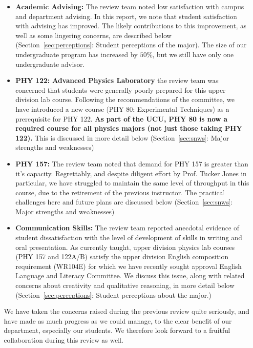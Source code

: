 \documentclass[12pt]{article}
\begin{document}
\begin{itemize}
\item {\bf Academic Advising:} The review team noted low satisfaction
  with campus and department advising.  In this report, we note that
  student satisfaction with advising has improved.  The likely
  contributions to this improvement, as well as some lingering
  concerns, are described below (Section~\ref{sec:perceptions}:
  Student perceptions of the major).  The size of our undergraduate
  program has increased by $50\%$, but we still have only one
  undergraduate advisor.

\item {\bf PHY 122: Advanced Physics Laboratory} the review team was
  concerned that students were generally poorly prepared for this
  upper division lab course.  Following the recommendations of the
  committee, we have introduced a new course (PHY 80: Experimental
  Techniques) as a prerequisite for PHY 122.  {\bf As part of the UCU,
    PHY 80 is now a required course for all physics majors (not just
    those taking PHY 122).}  This is discussed in more detail below
  (Section~\ref{sec:snws}: Major strengths and weaknesses)
  
\item {\bf PHY 157:} The review team noted that demand for PHY 157 is
  greater than it's capacity.  Regrettably, and despite diligent
  effort by Prof. Tucker Jones in particular, we have struggled to
  maintain the same level of throughput in this course, due to the
  retirement of the previous instructor.  The practical challenges
  here and future plans are discussed below (Section~\ref{sec:snws}:
  Major strengths and weaknesses)

\item {\bf Communication Skills:} The review team reported anecdotal
  evidence of student dissatisfaction with the level of development of
  skills in writing and oral presentation.  As currently taught, upper
  division physics lab courses (PHY 157 and 122A/B) satisfy the upper
  division English composition requirement (WR104E) for which we have
  recently sought approval English Language and Literacy Committee.
  We discuss this issue, along with related concerns about creativity
  and qualitative reasoning, in more detail below
  (Section~\ref{sec:perceptions}: Student perceptions about the
  major.)

\end{itemize}

We have taken the concerns raised during the previous review quite
seriously, and have made as much progress as we could manage, to the
clear benefit of our department, especially our students.  We therefore
look forward to a fruitful collaboration during this review as well.
\end{document}
